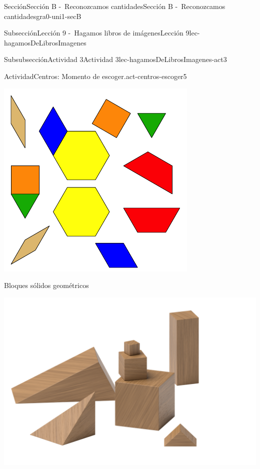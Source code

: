 \documentclass[twoside,10pt,]{article}
\begin{document}
\begin{sectionptx}{Sección}{Sección B -~Reconozcamos cantidades}{}{Sección B -~Reconozcamos cantidades}{}{}{gra0-uni1-secB}
\begin{subsectionptx}{Subsección}{Lección 9 -~Hagamos libros de imágenes}{}{Lección 9}{}{}{lec-hagamosDeLibrosImagenes}
\begin{subsubsectionptx}{Subsubsección}{Actividad 3}{}{Actividad 3}{}{}{lec-hagamosDeLibrosImagenes-act3}
\begin{activity}{Actividad}{Centros: Momento de escoger.}{act-centros-escoger5}
\begin{sidebyside}{2}{0.025}{0.025}{0.05}
\begin{sbspanel}{0.45}
\includegraphics[width=\linewidth]{external/svg-source/tikz-file-147344.pdf}
\end{sbspanel}%
\end{sidebyside}%
\begin{sidebyside}{2}{0.025}{0.025}{0.05}%
\begin{sbspanel}{0.45}%
Bloques sólidos geométricos%
\par
\includegraphics[width=\linewidth]{external/png-source/K.1.A Beta Student Workbook.Geoblocks.png}
\end{sbspanel}%

\end{sidebyside}
\end{activity}
\end{subsubsectionptx}
\end{subsectionptx}
\end{sectionptx}
\end{document}
